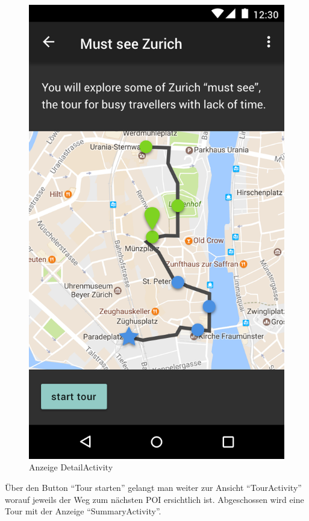 \documentclass[a4paper,10pt,xetex]{article}
\begin{document}
\begin{figure}
\begin{minipage}[b]{0.48\textwidth}
    \includegraphics[width=\textwidth]{DetailActivity}
    \caption{Anzeige DetailActivity}
  \end{minipage}
\end{figure}

\newpage
Über den Button ``Tour starten'' gelangt
man weiter zur Ansicht ``TourActivity'' worauf jeweils der Weg zum nächsten POI ersichtlich ist.
Abgeschossen wird eine Tour mit der Anzeige ``SummaryActivity''.
\end{document}
